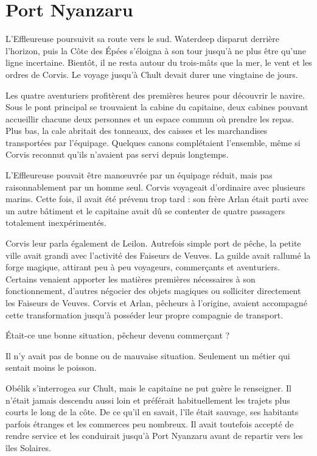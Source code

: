\chapter{Port Nyanzaru}

L'Effleureuse poursuivit sa route vers le sud. Waterdeep disparut derrière l'horizon, puis la Côte des Épées s'éloigna à son tour jusqu'à ne plus être qu'une ligne incertaine. Bientôt, il ne resta autour du trois-mâts que la mer, le vent et les ordres de Corvis. Le voyage jusqu'à Chult devait durer une vingtaine de jours.

Les quatre aventuriers profitèrent des premières heures pour découvrir le navire. Sous le pont principal se trouvaient la cabine du capitaine, deux cabines pouvant accueillir chacune deux personnes et un espace commun où prendre les repas. Plus bas, la cale abritait des tonneaux, des caisses et les marchandises transportées par l'équipage. Quelques canons complétaient l'ensemble, même si Corvis reconnut qu'ils n'avaient pas servi depuis longtemps.

L'Effleureuse pouvait être manœuvrée par un équipage réduit, mais pas raisonnablement par un homme seul. Corvis voyageait d'ordinaire avec plusieurs marins. Cette fois, il avait été prévenu trop tard : son frère Arlan était parti avec un autre bâtiment et le capitaine avait dû se contenter de quatre passagers totalement inexpérimentés.

Corvis leur parla également de Leilon. Autrefois simple port de pêche, la petite ville avait grandi avec l'activité des Faiseurs de Veuves. La guilde avait rallumé la forge magique, attirant peu à peu voyageurs, commerçants et aventuriers. Certains venaient apporter les matières premières nécessaires à son fonctionnement, d'autres négocier des objets magiques ou solliciter directement les Faiseurs de Veuves. Corvis et Arlan, pêcheurs à l'origine, avaient accompagné cette transformation jusqu'à posséder leur propre compagnie de transport.

\begin{narrateur}
Était-ce une bonne situation, pêcheur devenu commerçant ?

Il n'y avait pas de bonne ou de mauvaise situation. Seulement un métier qui sentait moins le poisson.
\end{narrateur}

Obélik s'interrogea sur Chult, mais le capitaine ne put guère le renseigner. Il n'était jamais descendu aussi loin et préférait habituellement les trajets plus courts le long de la côte. De ce qu'il en savait, l'île était sauvage, ses habitants parfois étranges et les commerces peu nombreux. Il avait toutefois accepté de rendre service et les conduirait jusqu'à Port Nyanzaru avant de repartir vers les îles Solaires.

